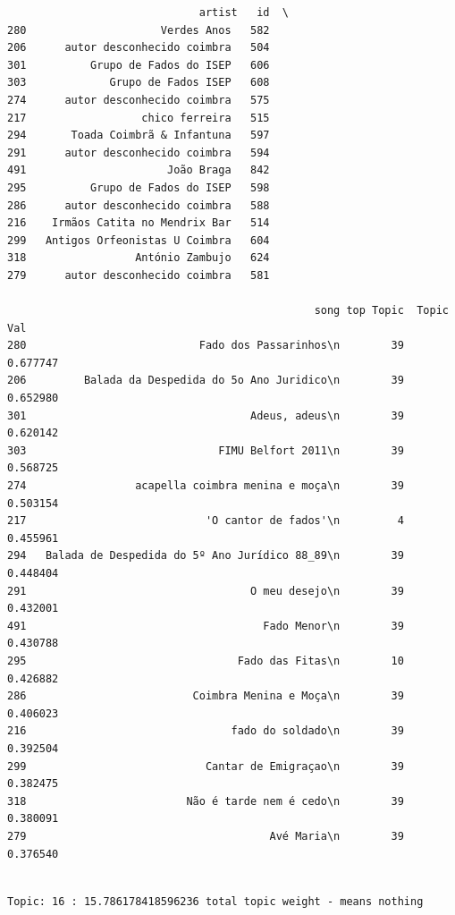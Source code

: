 \documentclass[11pt]{article}
\begin{document}
    
    \begin{verbatim}
                              artist   id  \
280                     Verdes Anos   582   
206      autor desconhecido coimbra   504   
301          Grupo de Fados do ISEP   606   
303             Grupo de Fados ISEP   608   
274      autor desconhecido coimbra   575   
217                  chico ferreira   515   
294       Toada Coimbrã & Infantuna   597   
291      autor desconhecido coimbra   594   
491                      João Braga   842   
295          Grupo de Fados do ISEP   598   
286      autor desconhecido coimbra   588   
216    Irmãos Catita no Mendrix Bar   514   
299   Antigos Orfeonistas U Coimbra   604   
318                 António Zambujo   624   
279      autor desconhecido coimbra   581   

                                                song top Topic  Topic Val  
280                           Fado dos Passarinhos\n        39   0.677747  
206         Balada da Despedida do 5o Ano Juridico\n        39   0.652980  
301                                   Adeus, adeus\n        39   0.620142  
303                              FIMU Belfort 2011\n        39   0.568725  
274                 acapella coimbra menina e moça\n        39   0.503154  
217                            'O cantor de fados'\n         4   0.455961  
294   Balada de Despedida do 5º Ano Jurídico 88_89\n        39   0.448404  
291                                   O meu desejo\n        39   0.432001  
491                                     Fado Menor\n        39   0.430788  
295                                 Fado das Fitas\n        10   0.426882  
286                          Coimbra Menina e Moça\n        39   0.406023  
216                                fado do soldado\n        39   0.392504  
299                            Cantar de Emigraçao\n        39   0.382475  
318                         Não é tarde nem é cedo\n        39   0.380091  
279                                      Avé Maria\n        39   0.376540  
    \end{verbatim}

    
    \begin{Verbatim}[commandchars=\\\{\}]

Topic: 16 : 15.786178418596236 total topic weight - means nothing

    \end{Verbatim}
\end{document}
